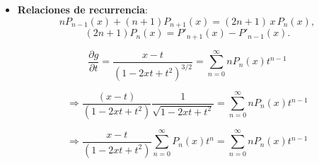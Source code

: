\begin{itemize}
\begin{scriptsize}
\paragraph{Demostración:}
Si usamos la relación
\begin{equation}
    x^{l-2k} = \frac{(l-2k)!}{(2l-2k)!} \frac{d^l}{dx^l} (x^{2l-2k}),
\end{equation}
en la expresión \eqref{seriePn}, tenemos que
\begin{align}
    P_n(x) &= \sum_{k=0}^{[n/2]} \frac{(-1)^k (2n-2k)!}{2^n k! (n-k)! (n-2k)!} \cdot \frac{(n-2k)!}{(2n-2k)!} \frac{d^n}{dx^n} (x^{2n-2k}) \\
	&= \frac{1}{2^n} \frac{d^n}{dx^n} \left( \sum_{k=0}^{[n/2]} \frac{(-1)^k}{k! (n-k)!} x^{2(n-k)} \right),
\end{align}
donde $n-k = n, n-1, \cdots, n-[n/2]$. Haciendo $m = n-k$, podemos escribir
\begin{align}
    P_n(x) &= \frac{1}{2^n} \frac{d^n}{dx^n} \left( \sum_{m=n-[n/2]}^{n} \frac{(-1)^{n-m}}{(n-m)! m!} (x^2)^m \right) \\
    &= \frac{(-1)^n}{n! 2^n} \frac{d^n}{dx^n} \left( \sum_{m=0}^{n} \frac{l!}{m! (l-m)!} (-x^2)^m \right) \\
    &= \frac{(-1)^n}{l! 2^n} \frac{d^n}{dx^n} (1-x^2)^n.
\end{align}
Note que agregamos $\sum_{m=0}^{n-[n/2]-1} (-1)^{n-m} x^{2m}$ que se anula por las derivadas ${d^n}/{dx^n}$. $\blacksquare$
\end{scriptsize}

\item \textbf{Relaciones de recurrencia}:
\begin{equation}\label{xPn}
nP_{n-1}(x)+(n+1)P_{n+1}(x)=(2n+1)\,x\,P_n(x), 
\end{equation}
\begin{equation}\label{PnPp}
(2n+1)P_n(x)=P'_{n+1}(x)-P'_{n-1}(x).
\end{equation}


\begin{equation}
    \frac{\partial g}{\partial t} = \frac{x-t}{(1-2xt+t^2)^{3/2}} = \sum_{n=0}^{\infty} n P_n(x) t^{n-1}
\end{equation}

\begin{equation}
    \Rightarrow \frac{(x-t)}{(1-2xt+t^2)} \frac{1}{\sqrt{1-2xt+t^2}} = \sum_{n=0}^{\infty} n P_n(x) t^{n-1}
\end{equation}

\begin{equation}
    \Rightarrow \frac{x-t}{(1-2xt+t^2)} \sum_{n=0}^{\infty} P_n(x) t^n = \sum_{n=0}^{\infty} n P_n(x) t^{n-1}
\end{equation}


\end{itemize}
